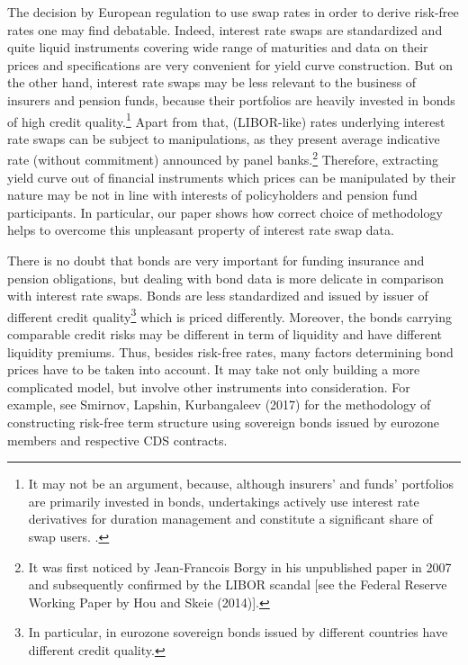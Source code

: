 	The decision by European regulation to use swap rates in order to derive risk-free rates one may find debatable. 
	Indeed, interest rate swaps are standardized and quite liquid instruments covering wide range of maturities and data on their prices and specifications are very convenient for yield curve construction. 
	But on the other hand,  interest rate swaps may be less relevant to the business of insurers and pension funds, because their portfolios are heavily invested in bonds of high credit quality.\footnote
{
{\color{red} It may not be an argument, because, although insurers' and funds' portfolios are primarily invested in bonds, undertakings actively use interest rate derivatives for duration management and constitute a significant share of swap users. }.
}
	Apart from that, (LIBOR-like) rates underlying interest rate swaps can be subject to manipulations, as they present average indicative rate (without commitment) announced by panel banks.\footnote
{ 
It was first noticed by Jean-Francois Borgy in his unpublished paper in 2007 and subsequently confirmed by the LIBOR scandal [see the Federal Reserve Working Paper by Hou and Skeie (2014)].
}
	Therefore, extracting yield curve out of financial instruments which prices can be manipulated by their nature may be not in line with interests of policyholders and pension fund participants. In particular, our paper shows how correct choice of methodology helps to overcome this unpleasant property of interest rate swap data.
	
	There is no doubt that bonds are very important for funding insurance and pension obligations, but dealing with bond data is more delicate in comparison with interest rate swaps. Bonds are less standardized and issued by issuer of different credit quality\footnote
{
In particular, in eurozone  sovereign bonds issued by different countries have different credit quality. 
} 
which is priced differently. 
	Moreover, the bonds carrying comparable credit risks may be different in term of liquidity and have different liquidity premiums. 
	Thus, besides risk-free rates, many factors determining bond prices have to be taken into account. 
	It may take not only building a more complicated model, but involve other instruments into consideration. 
	For example, see Smirnov, Lapshin, Kurbangaleev (2017) for the methodology of constructing risk-free term structure using sovereign bonds issued by eurozone members and respective CDS contracts.
	
